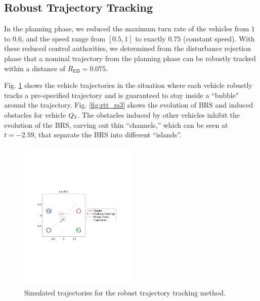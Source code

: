 \subsection{Robust Trajectory Tracking}
In the planning phase, we reduced the maximum turn rate of the vehicles from $1$ to $0.6$, and the speed range from $[0.5, 1]$ to exactly $0.75$ (constant speed). With these reduced control authorities, we determined from the disturbance rejection phase that a nominal trajectory from the planning phase can be robustly tracked within a distance of $R_{\text{EB}} = 0.075$.

Fig. \ref{fig:rtt_traj} shows the vehicle trajectories in the situation where each vehicle robustly tracks a pre-specified trajectory and is guaranteed to stay inside a ``bubble" around the trajectory. Fig. \ref{fig:rtt_rs3} shows the evolution of BRS and induced obstacles for vehicle $Q_3$. The obstacles induced by other vehicles inhibit the evolution of the BRS, carving out thin “channels,” which can be seen at $t = -2.59$, that separate the BRS into different “islands”. %

\begin{figure}[H]
  \centering
  \includegraphics[width=0.50\textwidth]{"fig/rtt_traj"}
  \caption{Simulated trajectories for the robust trajectory tracking method.}
  \label{fig:rtt_traj}
  \vspace{-1em}
\end{figure}

